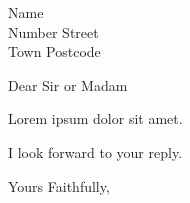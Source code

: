 \documentclass{MyLetter}
\begin{document}
\begin{letter}{Name \\ Number Street \\ Town Postcode}
\opening{Dear Sir or Madam}

Lorem ipsum dolor sit amet.

I look forward to your reply.

\closing{Yours Faithfully,}

\end{letter}
\end{document}
